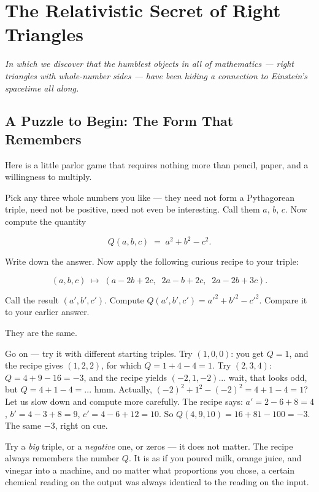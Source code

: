 \chapter{The Relativistic Secret of Right Triangles}


\textit{In which we discover that the humblest objects in all of mathematics --- right triangles with whole-number sides --- have been hiding a connection to Einstein's spacetime all along.}

\bigskip

\section*{A Puzzle to Begin: The Form That Remembers}

Here is a little parlor game that requires nothing more than pencil, paper, and a willingness to multiply.

Pick any three whole numbers you like --- they need not form a Pythagorean triple, need not be positive, need not even be interesting. Call them $a$, $b$, $c$. Now compute the quantity

\[
Q(a, b, c) \;=\; a^2 + b^2 - c^2.
\]

Write down the answer. Now apply the following curious recipe to your triple:

\[
(a, b, c) \;\longmapsto\; (a - 2b + 2c,\;\; 2a - b + 2c,\;\; 2a - 2b + 3c).
\]

Call the result $(a', b', c')$. Compute $Q(a', b', c') = a'^2 + b'^2 - c'^2$. Compare it to your earlier answer.

They are the same.

Go on --- try it with different starting triples. Try $(1, 0, 0)$: you get $Q = 1$, and the recipe gives $(1, 2, 2)$, for which $Q = 1 + 4 - 4 = 1$. Try $(2, 3, 4)$: $Q = 4 + 9 - 16 = -3$, and the recipe yields $(-2, 1, -2)$... wait, that looks odd, but $Q = 4 + 1 - 4 = ... $ hmm. Actually, $(-2)^2 + 1^2 - (-2)^2 = 4 + 1 - 4 = 1$? Let us slow down and compute more carefully. The recipe says: $a' = 2 - 6 + 8 = 4$, $b' = 4 - 3 + 8 = 9$, $c' = 4 - 6 + 12 = 10$. So $Q(4, 9, 10) = 16 + 81 - 100 = -3$. The same $-3$, right on cue.

Try a \textit{big} triple, or a \textit{negative} one, or zeros --- it does not matter. The recipe always remembers the number $Q$. It is as if you poured milk, orange juice, and vinegar into a machine, and no matter what proportions you chose, a certain chemical reading on the output was always identical to the reading on the input.


